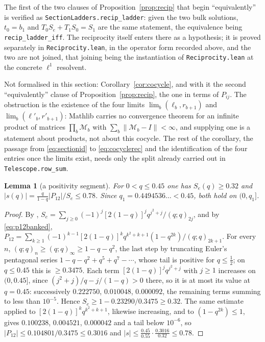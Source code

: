 \documentclass[11pt]{article}
\theoremstyle{plain}
\newtheorem{lemma}[theorem]{Lemma}
\theoremstyle{definition}
\theoremstyle{remark}
\begin{document}
The first of the two clauses of Proposition~\ref{prop:recip} that begin ``equivalently'' is
verified as \texttt{SectionLadders.recip\_ladder}: given the two bulk solutions, $t_0=b_1$ and
$T_0S_e+T_1S_0=S_1$ are the same statement, the equivalence being
\texttt{recip\_ladder\_iff}. The reciprocity itself enters there as a hypothesis; it is proved
separately in \texttt{Reciprocity.lean}, in the operator form recorded above, and the two are not
joined, that joining being the instantiation of \texttt{Reciprocity.lean} at the concrete
$\ell^1$ resolvent.

Not formalised in this section: Corollary~\ref{cor:cocycle}, and with it the second
``equivalently'' clause of Proposition~\ref{prop:recip}, the one in terms of $P_{ij}$. The
obstruction is the existence of the four limits $\lim_b(\ell_b,r_{b+1})$ and
$\lim_b(\ell'_b,r'_{b+1})$: Mathlib carries no convergence theorem for an infinite product of
matrices $\prod_b\mathcal M_b$ with $\sum_b\|\mathcal M_b-I\|<\infty$, and supplying one is a
statement about products, not about this cocycle. The rest of the corollary, the passage from
\eqref{eq:sectionid} to \eqref{eq:cocyclerec} and the identification of the four entries once the
limits exist, needs only the split already carried out in \texttt{Telescope.row\_sum}.

\begin{lemma}[a positivity segment]\label{lem:posseg}
For $0<q\le0.45$ one has $S_e(q)\ge0.32$ and $|s(q)|=\tfrac{q}{1-q}|P_{12}|/S_e\le0.78$. Since
$q_1=0.4494536\ldots<0.45$, both hold on $(0,q_1]$.
\end{lemma}

\begin{proof}
By {\cite[Proposition \textup{prop:qtrig}]{Bonfioli2026bA}}, $S_e=\sum_{j\ge0}(-1)^j[2(1-q)]^jq^{j^2+j}/(q;q)_{2j}$, and by
\eqref{eq:p12banked},
$P_{12}=\sum_{k\ge1}(-1)^{k-1}[2(1-q)]^kq^{k^2+k+1}(1-q^{2k})/(q;q)_{2k+1}$. For every $n$,
$(q;q)_n\ge(q;q)_\infty\ge1-q-q^2$, the last step by truncating Euler's pentagonal series
$1-q-q^2+q^5+q^7-\cdots$, whose tail is positive for $q\le\tfrac12$; on $q\le0.45$ this is
$\ge0.3475$. Each term $[2(1-q)]^jq^{j^2+j}$ with $j\ge1$ increases on $(0,0.45]$, since
$(j^2+j)/q-j/(1-q)>0$ there, so it is at most its value at $q=0.45$: successively
$0.222750$, $0.010048$, $0.000092$, the remaining terms summing to less than $10^{-5}$. Hence
$S_e\ge1-0.23290/0.3475\ge0.32$. The same estimate applied to $[2(1-q)]^kq^{k^2+k+1}$, likewise
increasing, and to $(1-q^{2k})\le1$, gives $0.100238$, $0.004521$, $0.000042$ and a tail below
$10^{-6}$, so $|P_{12}|\le0.104801/0.3475\le0.3016$ and
$|s|\le\tfrac{0.45}{0.55}\cdot\tfrac{0.3016}{0.32}\le0.78$.
\end{proof}
\end{document}
